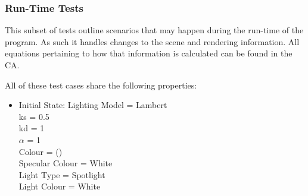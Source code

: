 \documentclass[12pt, titlepage]{article}
\begin{document}
%	
%	
%
%
%	
%	
%	
%	
%	
%	
%	
%	
%	
%	
%	
%

\subsubsection{Run-Time Tests}
This subset of tests outline scenarios that may happen during the run-time of 
the program. As such it handles changes to the scene and rendering information. 
All equations pertaining to how that information is calculated can be found in 
the CA.

All of these test cases share the following properties:
\begin{itemize}
	\item[] Initial State: Lighting Model = Lambert\\
	ks = 0.5 \\ kd = 1 \\ $\alpha$ = 1 \\ Colour = () \\ Specular Colour = 
	White \\ Light Type = Spotlight \\ Light Colour = White \\ 
\end{itemize}
\end{document}
